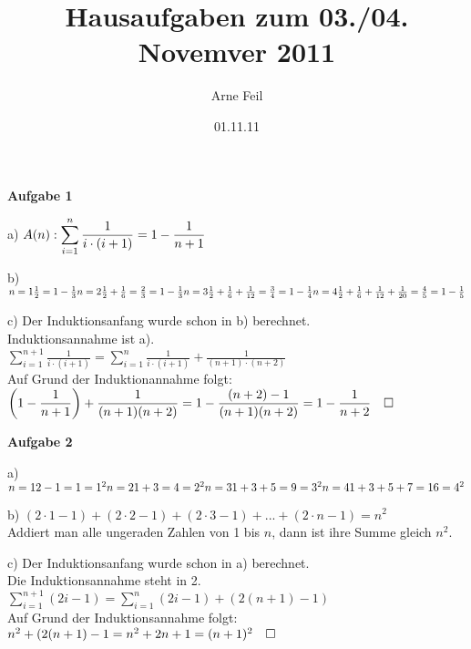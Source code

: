 \documentclass{scrartcl}
\title{Hausaufgaben zum 03./04. Novemver 2011}
\author{Arne Feil}
\date{01.11.11}
\begin{document}
\textbf{Aufgabe 1}
\begin{description}
\item{a)}
$\displaystyle A(n): \sum_{i=1}^n\frac{1}{i\cdot(i+1)} = 1-\frac{1}{n+1}\\$
\item{b)}
$n=1\\
\frac{1}{2}=1-\frac{1}{3}\\\\
n=2\\
\frac{1}{2}+\frac{1}{6}=\frac{2}{3}=1-\frac{1}{3}\\\\
n=3\\
\frac{1}{2}+\frac{1}{6}+\frac{1}{12}=\frac{3}{4}=1-\frac{1}{4}\\\\
n=4\\
\frac{1}{2}+\frac{1}{6}+\frac{1}{12}+\frac{1}{20}=\frac{4}{5}=1-\frac{1}{5}$
\item{c)}
Der Induktionsanfang wurde schon in b) berechnet.\\
Induktionsannahme ist a).\\
$
\displaystyle\sum_{i=1}^{n+1}\frac{1}{i\cdot(i+1)} = \sum_{i=1}^n\frac{1}{i\cdot(i+1)}+\frac{1}{(n+1)\cdot(n+2)}
$\\
Auf Grund der Induktionannahme folgt:
$\\
\displaystyle{\left(1-\frac{1}{n+1}\right)+\frac{1}{(n+1)(n+2)}=1-\frac{(n+2)-1}{(n+1)(n+2)}\\
= 1-\frac{1}{n+2} \quad \square}
$
\end{description}
\textbf{Aufgabe 2}
\begin{description}
\item{a)}
$n=1\\
2-1=1=1^2\\\\
n=2\\
1+3=4=2^2\\\\
n=3\\
1+3+5=9=3^2\\\\
n=4\\
1+3+5+7=16=4^2$
\item{b)}
$(2\cdot 1-1)+(2\cdot 2-1)+(2\cdot 3-1)+...+(2\cdot n-1)=n^2$\\
Addiert man alle ungeraden Zahlen von 1 bis $n$, dann ist ihre Summe gleich $n^2$.
\item{c)}
Der Induktionsanfang wurde schon in a) berechnet.\\
Die Induktionsannahme steht in 2.\\
$
\displaystyle\sum_{i=1}^{n+1}(2i-1) = \sum_{i=1}^n(2i-1)+(2(n+1)-1)
$\\
Auf Grund der Induktionsannahme folgt:\\
$n^2+(2(n+1)-1\\
=n^2+2n+1=(n+1)^2 \quad \square$
\end{description}
\end{document}
